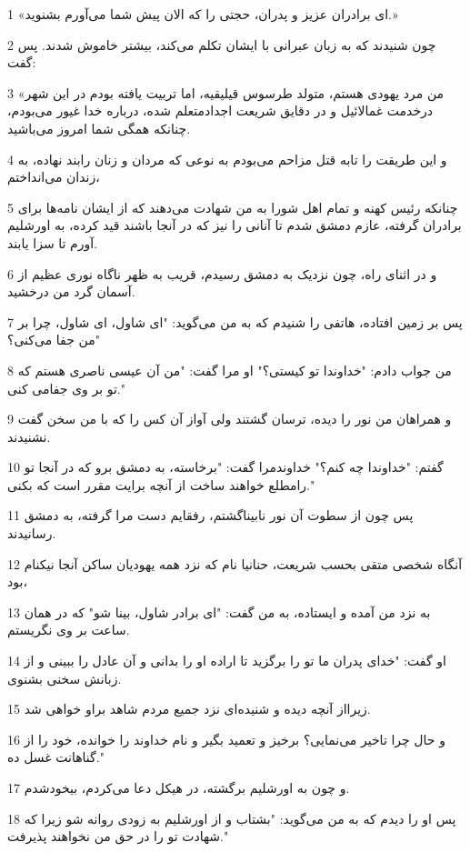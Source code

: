 \par 1 «ای برادران عزیز و پدران، حجتی را که الان پیش شما می‌آورم بشنوید.»
\par 2 چون شنیدند که به زبان عبرانی با ایشان تکلم می‌کند، بیشتر خاموش شدند. پس گفت:
\par 3 «من مرد یهودی هستم، متولد طرسوس قیلیقیه، اما تربیت یافته بودم در این شهر درخدمت غمالائیل و در دقایق شریعت اجدادمتعلم شده، درباره خدا غیور می‌بودم، چنانکه همگی شما امروز می‌باشید.
\par 4 و این طریقت را تابه قتل مزاحم می‌بودم به نوعی که مردان و زنان رابند نهاده، به زندان می‌انداختم،
\par 5 چنانکه رئیس کهنه و تمام اهل شورا به من شهادت می‌دهند که از ایشان نامه‌ها برای برادران گرفته، عازم دمشق شدم تا آنانی را نیز که در آنجا باشند قید کرده، به اورشلیم آورم تا سزا یابند.
\par 6 و در اثنای راه، چون نزدیک به دمشق رسیدم، قریب به ظهر ناگاه نوری عظیم از آسمان گرد من درخشید.
\par 7 پس بر زمین افتاده، هاتفی را شنیدم که به من می‌گوید: "ای شاول، ای شاول، چرا بر من جفا می‌کنی؟"
\par 8 من جواب دادم: "خداوندا تو کیستی؟" او مرا گفت: "من آن عیسی ناصری هستم که تو بر وی جفامی کنی."
\par 9 و همراهان من نور را دیده، ترسان گشتند ولی آواز آن کس را که با من سخن گفت نشنیدند.
\par 10 گفتم: "خداوندا چه کنم؟" خداوندمرا گفت: "برخاسته، به دمشق برو که در آنجا تو رامطلع خواهند ساخت از آنچه برایت مقرر است که بکنی."
\par 11 پس چون از سطوت آن نور نابیناگشتم، رفقایم دست مرا گرفته، به دمشق رسانیدند.
\par 12 آنگاه شخصی متقی بحسب شریعت، حنانیا نام که نزد همه یهودیان ساکن آنجا نیکنام بود،
\par 13 به نزد من آمده و ایستاده، به من گفت: "ای برادر شاول، بینا شو" که در همان ساعت بر وی نگریستم.
\par 14 او گفت: "خدای پدران ما تو را برگزید تا اراده او را بدانی و آن عادل را ببینی و از زبانش سخنی بشنوی.
\par 15 زیرااز آنچه دیده و شنیده‌ای نزد جمیع مردم شاهد براو خواهی شد.
\par 16 و حال چرا تاخیر می‌نمایی؟ برخیز و تعمید بگیر و نام خداوند را خوانده، خود را از گناهانت غسل ده."
\par 17 و چون به اورشلیم برگشته، در هیکل دعا می‌کردم، بیخودشدم.
\par 18 پس او را دیدم که به من می‌گوید: "بشتاب و از اورشلیم به زودی روانه شو زیرا که شهادت تو را در حق من نخواهند پذیرفت."

